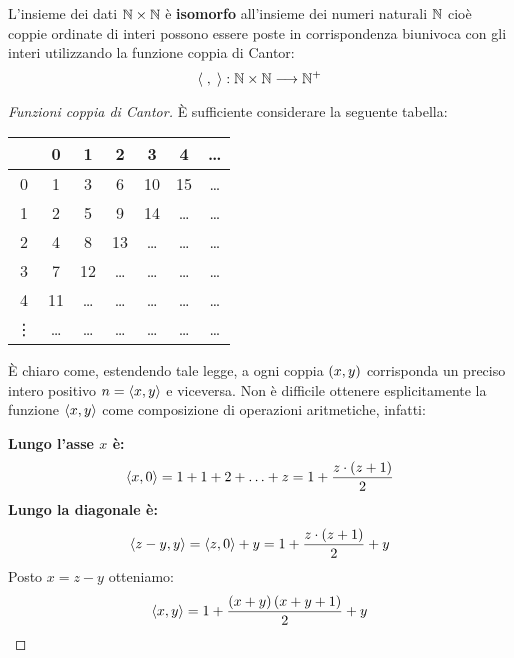 \documentclass{lectures}
\begin{document}
\clearpage
\begin{multicols}{2}
\begin{theorem}
    L'insieme dei dati \(\mathbb{N} \times \mathbb{N}\) è \textbf{isomorfo} all'insieme dei numeri naturali \(\mathbb{N}\) cioè coppie ordinate di interi possono essere poste in corrispondenza biunivoca con gli interi utilizzando la funzione coppia di Cantor:
    \[
        \left\langle\;,\;\right\rangle:\mathbb{N} \times \mathbb{N}\longrightarrow \mathbb{N}^{+}
    \]
\end{theorem}
\begin{proof}[Funzioni coppia di Cantor]
    È sufficiente considerare la seguente tabella:
    \begin{table}
        \begin{tabular}{c|CCCCCC}
              & 0 & 1 & 2 & 3 & 4 & \ldots\\
              & 1  & 3  & 6  & 10 & 15 & \ldots\\
             1 & 2  & 5  & 9  & 14 & \ldots & \ldots\\
             2 & 4  & 8  & 13 & \ldots & \ldots & \ldots\\
             3 & 7  & 12 & \ldots & \ldots & \ldots & \ldots\\
             4 & 11 & \ldots & \ldots & \ldots & \ldots & \ldots\\
             \vdots & \ldots & \ldots & \ldots & \ldots & \ldots & \ldots\\
        \end{tabular}
    \end{table}
    È chiaro come, estendendo tale legge, a ogni coppia \(\left(x,y\right)\) corrisponda un preciso intero positivo \(n = \left\langle x,y\right\rangle\) e viceversa. Non è difficile ottenere esplicitamente la funzione \(\left\langle x,y\right\rangle\) come composizione di operazioni aritmetiche, infatti:

    \textbf{Lungo l'asse \(x\) è:}
    \[
        \left\langle x,0\right\rangle = 1 + 1+ 2 + \ldots + z = 1 + \frac{z \cdot \left(z+1\right)}{2}
    \]
    \textbf{Lungo la diagonale è:}
    \[
        \left\langle z-y, y\right\rangle = \left\langle z, 0\right\rangle + y = 1 + \frac{z\cdot\left(z+1\right)}{2} + y
    \]
    Posto \(x=z-y\) otteniamo:
    \[
        \left\langle x,y\right\rangle = 1 + \frac{\left(x+y\right)\left(x+y+1\right)}{2} + y
    \]
\end{proof}
\end{multicols}
\clearpage
\end{document}
